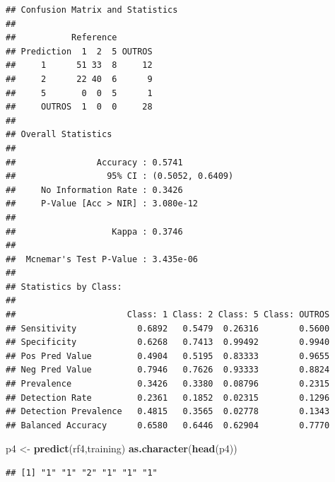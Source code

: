 \documentclass[]{article}
\newenvironment{Shaded}{\begin{snugshade}}{\end{snugshade}}
\newcommand{\CommentTok}[1]{\textcolor[rgb]{0.56,0.35,0.01}{\textit{#1}}}
\newcommand{\DataTypeTok}[1]{\textcolor[rgb]{0.13,0.29,0.53}{#1}}
\newcommand{\KeywordTok}[1]{\textcolor[rgb]{0.13,0.29,0.53}{\textbf{#1}}}
\newcommand{\NormalTok}[1]{#1}
\newcommand{\OperatorTok}[1]{\textcolor[rgb]{0.81,0.36,0.00}{\textbf{#1}}}
\newcommand{\StringTok}[1]{\textcolor[rgb]{0.31,0.60,0.02}{#1}}
\begin{document}
\begin{Shaded}
\end{Shaded}

\begin{verbatim}
## Confusion Matrix and Statistics
## 
##           Reference
## Prediction  1  2  5 OUTROS
##     1      51 33  8     12
##     2      22 40  6      9
##     5       0  0  5      1
##     OUTROS  1  0  0     28
## 
## Overall Statistics
##                                           
##                Accuracy : 0.5741          
##                  95% CI : (0.5052, 0.6409)
##     No Information Rate : 0.3426          
##     P-Value [Acc > NIR] : 3.080e-12       
##                                           
##                   Kappa : 0.3746          
##                                           
##  Mcnemar's Test P-Value : 3.435e-06       
## 
## Statistics by Class:
## 
##                      Class: 1 Class: 2 Class: 5 Class: OUTROS
## Sensitivity            0.6892   0.5479  0.26316        0.5600
## Specificity            0.6268   0.7413  0.99492        0.9940
## Pos Pred Value         0.4904   0.5195  0.83333        0.9655
## Neg Pred Value         0.7946   0.7626  0.93333        0.8824
## Prevalence             0.3426   0.3380  0.08796        0.2315
## Detection Rate         0.2361   0.1852  0.02315        0.1296
## Detection Prevalence   0.4815   0.3565  0.02778        0.1343
## Balanced Accuracy      0.6580   0.6446  0.62904        0.7770
\end{verbatim}

\begin{Shaded}
\begin{Highlighting}[]
\NormalTok{p4 <-}\StringTok{ }\KeywordTok{predict}\NormalTok{(rf4,training)}
\KeywordTok{as.character}\NormalTok{(}\KeywordTok{head}\NormalTok{(p4))}
\end{Highlighting}
\end{Shaded}

\begin{verbatim}
## [1] "1" "1" "2" "1" "1" "1"
\end{verbatim}
\end{document}
